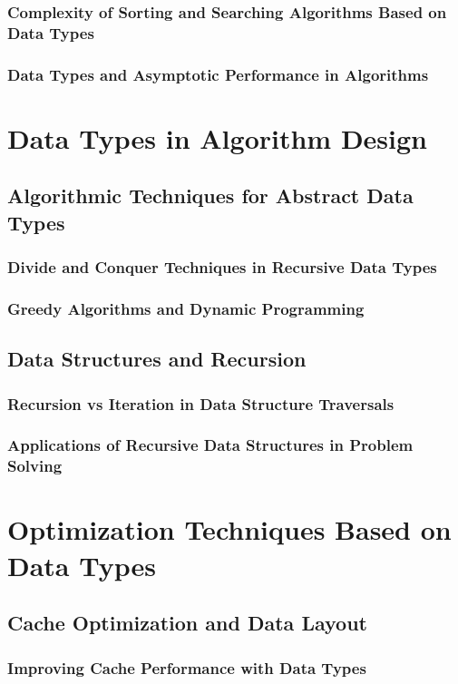 \documentclass[12pt, oneside]{book}
\begin{document}
\subsubsection{Complexity of Sorting and Searching Algorithms Based on Data Types}
\subsubsection{Data Types and Asymptotic Performance in Algorithms}
\section{Data Types in Algorithm Design}
\subsection{Algorithmic Techniques for Abstract Data Types}
\subsubsection{Divide and Conquer Techniques in Recursive Data Types}
\subsubsection{Greedy Algorithms and Dynamic Programming}
\subsection{Data Structures and Recursion}
\subsubsection{Recursion vs Iteration in Data Structure Traversals}
\subsubsection{Applications of Recursive Data Structures in Problem Solving}
\section{Optimization Techniques Based on Data Types}
\subsection{Cache Optimization and Data Layout}
\subsubsection{Improving Cache Performance with Data Types}
\end{document}
